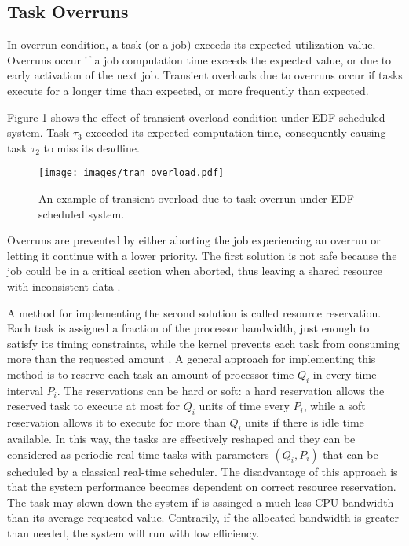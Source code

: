 \subsection{Task Overruns}
In overrun condition, a task (or a job) exceeds its expected utilization value.
Overruns occur if a job computation time exceeds the expected value, or due to early activation of the next job.
Transient overloads due to overruns occur if tasks execute for a longer time than expected, or more frequently than expected.

Figure \ref{transient_EDF} shows the effect of transient overload condition under EDF-scheduled system. Task $\tau_3$ exceeded its expected computation time, consequently causing task $\tau_2$ to miss its deadline.
\begin{figure}[ht]
    \centering
    \texttt{[image: images/tran\_overload.pdf]}
    \caption{An example of transient overload due to task overrun under EDF-scheduled system.}
    \label{transient_EDF}
\end{figure}

Overruns are prevented by either aborting the job experiencing an overrun or letting it continue with a lower priority. 
The first solution is not safe because the job could be in a critical section when aborted, thus leaving a shared resource with inconsistent data 
\cite{buttazzo2011hard}. 

A method for implementing the second solution is called resource reservation.
Each task is assigned a fraction of the processor bandwidth, just enough to satisfy its timing constraints, while the kernel prevents each task from consuming more than the requested amount \cite{buttazzo2011hard}. 
A general approach for implementing this method is to reserve each task an amount of processor time $Q_i$ in every time interval $P_i$. 
The reservations can be hard or soft: a hard reservation allows the reserved task to execute at most for $Q_i$ units of time every $P_i$, while a soft reservation allows it to execute for more than $Q_i$ units if there is idle time available. 
In this way, the tasks are effectively reshaped and they can be considered as 
periodic real-time tasks with parameters \( (Q_i, P_i) \) that can be scheduled by a classical real-time scheduler.
The disadvantage of this approach is that the system performance becomes dependent on correct resource reservation. The task may slown down the system if is assinged a much less CPU bandwidth than its average requested value. Contrarily, if the allocated bandwidth is greater than needed, the system will run with low efficiency.


